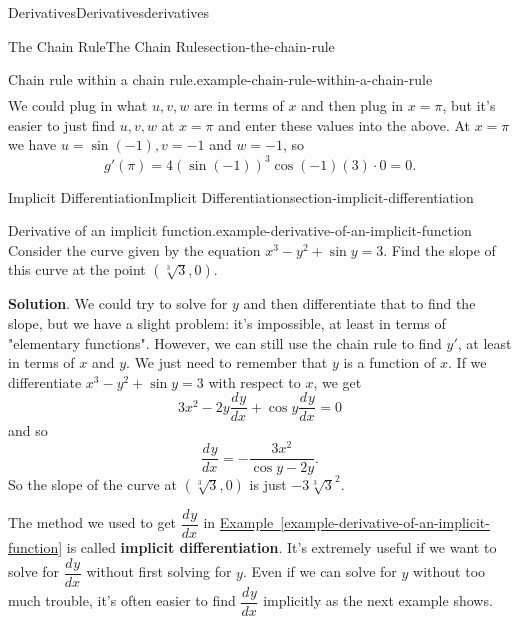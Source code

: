 \documentclass[oneside,10pt,]{book}
\newcommand{\terminology}[1]{\textbf{#1}}
\numberwithin{equation}{section}
\newcommand{\dv}[3][]{\dfrac{d^{#1} #2}{d #3^{#1}}}
\begin{document}
\begin{chapterptx}{Derivatives}{}{Derivatives}{}{}{derivatives}
\begin{sectionptx}{The Chain Rule}{}{The Chain Rule}{}{}{section-the-chain-rule}
\begin{example}{Chain rule within a chain rule.}{example-chain-rule-within-a-chain-rule}
\begin{align*}
\end{align*}
We could plug in what \(u,v,w\) are in terms of \(x\) and then plug in \(x=\pi\), but it's easier to just find \(u,v,w\) at \(x=\pi\) and enter these values into the above. At \(x=\pi\) we have \(u = \sin(-1), v = -1\) and \(w = -1\), so%
\begin{equation*}
g'(\pi) = 4(\sin(-1))^{3}\cos(-1)(3)\cdot0 = 0.
\end{equation*}
%
\end{example}
\end{sectionptx}
%
%
\typeout{************************************************}
\typeout{************************************************}
%
\begin{sectionptx}{Implicit Differentiation}{}{Implicit Differentiation}{}{}{section-implicit-differentiation}
\begin{example}{Derivative of an implicit function.}{example-derivative-of-an-implicit-function}%
\hypertarget{p-158}{}%
Consider the curve given by the equation \(x^{3} - y^{2} + \sin y = 3\). Find the slope of this curve at the point \((\sqrt[3]{3},0)\).%
\par\smallskip%
\noindent\textbf{Solution}.\hypertarget{solution-33}{}\quad%
\hypertarget{p-159}{}%
We could try to solve for \(y\) and then differentiate that to find the slope, but we have a slight problem: it's impossible, at least in terms of "elementary functions". However, we can still use the chain rule to find \(y'\), at least in terms of \(x\) and \(y\). We just need to remember that \(y\) is a function of \(x\). If we differentiate \(x^{3} - y^{2} + \sin y = 3\) with respect to \(x\), we get%
\begin{equation*}
3x^{2} - 2y\dv{y}{x} + \cos y \dv{y}{x} = 0
\end{equation*}
and so%
\begin{equation*}
\dv{y}{x} = -\frac{3x^{2}}{\cos y - 2y}.
\end{equation*}
So the slope of the curve at \((\sqrt[3]{3},0)\) is just \(-3\sqrt[3]{3}^{2}\).%
\end{example}
\hypertarget{p-160}{}%
The method we used to get \(\dv{y}{x}\) in \hyperref[example-derivative-of-an-implicit-function]{Example~\ref{example-derivative-of-an-implicit-function}} is called \terminology{implicit differentiation}. It's extremely useful if we want to solve for \(\dv{y}{x}\) without first solving for \(y\). Even if we can solve for \(y\) without too much trouble, it's often easier to find \(\dv{y}{x}\) implicitly as the next example shows.%

\end{sectionptx}
\end{chapterptx}
\end{document}
